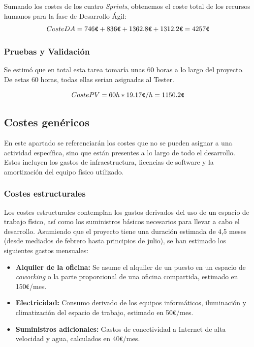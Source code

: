 \documentclass[11pt, letterpaper]{article}
\begin{document}
Sumando los costes de los cuatro \textit{Sprints}, obtenemos el coste total de los recursos humanos para la fase de Desarrollo Ágil:
\begin{equation}
    Coste DA = 746\verb|€| + 836\verb|€| + 1362{.}8\verb|€| + 1312{.}2\verb|€| = 4257\verb|€|
\end{equation}
\subsubsection{Pruebas y Validación}
Se estimó que en total esta tarea tomaría unas 60 horas a lo largo del proyecto. De estas 60 horas, todas ellas serian asignadas al Tester.

\begin{equation}
    Coste PV = 60h * 19{.}17\verb|€|/h = 1150{.}2\verb|€|
\end{equation}
\subsection{Costes genéricos}
En este apartado se referenciarán los costes que no se pueden asignar a una actividad específica, sino que están presentes a lo largo de todo el desarrollo. Estos incluyen los gastos de infraestructura, licencias de software y la amortización del equipo físico utilizado.

\subsubsection{Costes estructurales}
Los costes estructurales contemplan los gastos derivados del uso de un espacio de trabajo físico, así como los suministros básicos necesarios para llevar a cabo el desarrollo. Asumiendo que el proyecto tiene una duración estimada de 4,5 meses (desde mediados de febrero hasta principios de julio), se han estimado los siguientes gastos mensuales:

\begin{itemize}
    \item \textbf{Alquiler de la oficina:} Se asume el alquiler de un puesto en un espacio de \textit{coworking} o la parte proporcional de una oficina compartida, estimado en 150\verb|€|/mes. \cite{barcelona_coworking}
    \item \textbf{Electricidad:} Consumo derivado de los equipos informáticos, iluminación y climatización del espacio de trabajo, estimado en 50\verb|€|/mes. \cite{naturgy_precios}
    \item \textbf{Suministros adicionales:} Gastos de conectividad a Internet de alta velocidad y agua, calculados en 40\verb|€|/mes.
\end{itemize}
\end{document}
